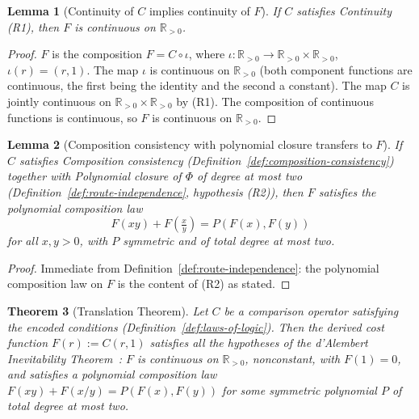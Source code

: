 \documentclass[11pt,a4paper]{article}
\newtheorem{theorem}{Theorem}
\newtheorem{lemma}[theorem]{Lemma}
\theoremstyle{definition}
\theoremstyle{remark}
\begin{document}
\begin{lemma}[Continuity of $C$ implies continuity of $F$]
\label{lem:continuity}
If $C$ satisfies Continuity (R1), then $F$ is continuous on
$\mathbb{R}_{>0}$.
\end{lemma}

\begin{proof}
$F$ is the composition $F = C \circ \iota$, where
$\iota : \mathbb{R}_{>0} \to \mathbb{R}_{>0} \times \mathbb{R}_{>0}$,
$\iota(r) = (r, 1)$. The map $\iota$ is continuous on $\mathbb{R}_{>0}$
(both component functions are continuous, the first being the identity
and the second a constant). The map $C$ is jointly continuous on
$\mathbb{R}_{>0} \times \mathbb{R}_{>0}$ by (R1). The composition of
continuous functions is continuous, so $F$ is continuous on
$\mathbb{R}_{>0}$.
\end{proof}

\begin{lemma}[Composition consistency with polynomial closure transfers to $F$]
\label{lem:route-independence-transfer}
If $C$ satisfies Composition consistency
(Definition~\ref{def:composition-consistency}) together with Polynomial
closure of $\Phi$ of degree at most two
(Definition~\ref{def:route-independence}, hypothesis (R2)), then $F$
satisfies the polynomial composition law
\[
F(xy) + F\!\left(\tfrac{x}{y}\right) = P(F(x), F(y))
\]
for all $x, y > 0$, with $P$ symmetric and of total degree at most two.
\end{lemma}

\begin{proof}
Immediate from Definition~\ref{def:route-independence}: the polynomial
composition law on $F$ is the content of (R2) as stated.
\end{proof}

\begin{theorem}[Translation Theorem]
\label{thm:translation}
Let $C$ be a comparison operator satisfying the encoded conditions
(Definition~\ref{def:laws-of-logic}). Then the derived cost function
$F(r) := C(r, 1)$ satisfies all the hypotheses of the d'Alembert
Inevitability
Theorem~\cite[Theorem~3]{WashburnZlatanovicAllahyarov2026}: $F$ is
continuous on $\mathbb{R}_{>0}$, nonconstant, with $F(1) = 0$, and
satisfies a polynomial composition law $F(xy) + F(x/y) = P(F(x), F(y))$
for some symmetric polynomial $P$ of total degree at most two.
\end{theorem}
\end{document}
